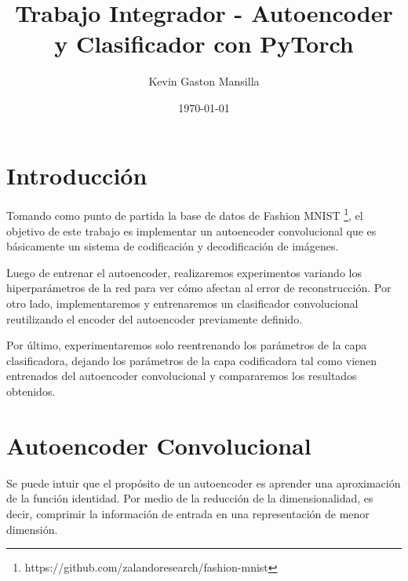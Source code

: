 \documentclass[aps,prl,reprint,groupedaddress]{revtex4-2}
\begin{document}
\title{
Trabajo Integrador - Autoencoder y Clasificador con PyTorch
}

\author{Kevin Gaston Mansilla}

\affiliation{}

\date{\today}

\begin{abstract}
\end{abstract}


\maketitle

\section{Introducción}

Tomando como punto de partida la base de datos de Fashion MNIST
\footnote{https://github.com/zalandoresearch/fashion-mnist}, el objetivo de 
este trabajo es implementar un autoencoder convolucional que es básicamente 
un sistema de codificación y decodificación de imágenes.

Luego de entrenar el autoencoder, realizaremos experimentos variando los 
hiperparámetros de la red para ver cómo afectan al error de reconstrucción. 
Por otro lado, implementaremos y entrenaremos un clasificador convolucional 
reutilizando el encoder del autoencoder previamente definido. 

Por último, experimentaremos solo reentrenando los parámetros de la capa 
clasificadora, dejando los parámetros de la capa codificadora tal como vienen 
entrenados del autoencoder convolucional y compararemos los resultados obtenidos.

\section{Autoencoder Convolucional}
Se puede intuir que el propósito de un autoencoder es aprender una aproximación 
de la función identidad. Por medio de la  reducción de la dimensionalidad,
es decir, comprimir la información de entrada en una representación de menor
dimensión.
\end{document}
